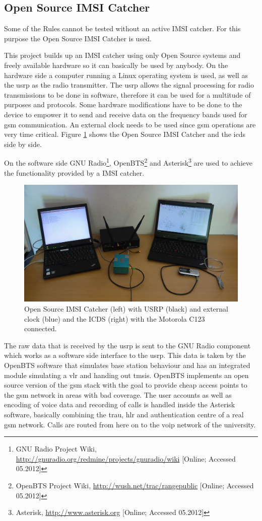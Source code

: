 \subsection{Open Source IMSI Catcher}
Some of the Rules cannot be tested without an active IMSI catcher.
For this purpose the Open Source IMSI Catcher \cite{dennis} is used.

This project builds up an IMSI catcher using only Open Source systems and freely available hardware so it can basically be used by anybody.
On the hardware side a computer running a Linux operating system is used, as well as the \gls{usrp} as the radio transmitter.
The \gls{usrp} allows the signal processing for radio transmissions to be done in software, therefore it can be used for a multitude of purposes and protocols.
Some hardware modifications have to be done to the device to empower it to send and receive data on the frequency bands used for \gls{gsm} communication.
An external clock needs to be used since \gls{gsm} operations are very time critical.
Figure \ref{fig:setup} shows the Open Source IMSI Catcher and the \gls{icds} side by side.

On the software side GNU Radio\footnote{GNU Radio Project Wiki, \url{http://gnuradio.org/redmine/projects/gnuradio/wiki} [Online; Accessed 05.2012]}, OpenBTS\footnote{OpenBTS Project Wiki, \url{http://wush.net/trac/rangepublic} [Online; Accessed 05.2012]} and Asterisk\footnote{Asterisk, \url{http://www.asterisk.org} [Online; Accessed 05.2012]} are used to achieve the functionality provided by a IMSI catcher.
\begin{figure}
\centering
\includegraphics[width=.95\textwidth]{../Images/catcherICDS}
\caption{Open Source IMSI Catcher (left) with USRP (black) and external clock (blue) and the ICDS (right) with the Motorola C123 connected.}
\label{fig:setup}
\end{figure}
The raw data that is received by the \gls{usrp} is sent to the GNU Radio component which works as a software side interface to the \gls{usrp}.
This data is taken by the OpenBTS software that simulates base station behaviour and has an integrated module simulating a \gls{vlr} and handing out \glspl{tmsi}.
OpenBTS implements an open source version of the \gls{gsm} stack with the goal to provide cheap access points to the \gls{gsm} network in areas with bad coverage.
The user accounts as well as encoding of voice data and recording of calls is handled inside the Asterisk software, basically combining the \gls{trau}, \gls{hlr} and authentication centre of a real \gls{gsm} network.
Calls are routed from here on to the \gls{voip} network of the university.

